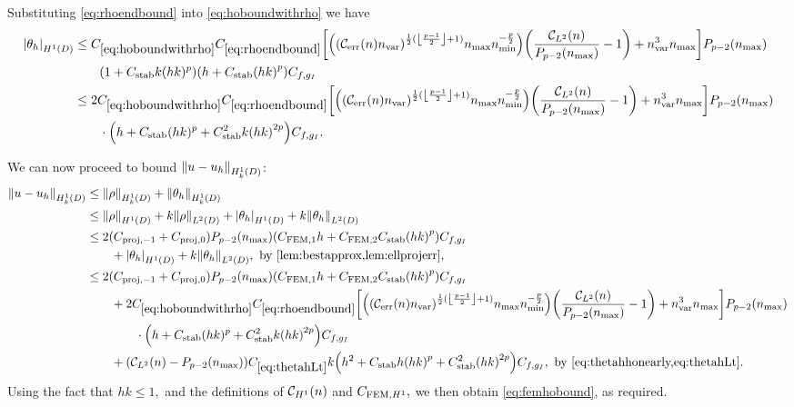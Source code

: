 Substituting \cref{eq:rhoendbound} into \cref{eq:hoboundwithrho} we have
\begin{align}
\SNHoD{\thetah} &\leq \CHobound\Crhoendbound \mleft[ \mleft(\mleft(\En\nvar\mright)^{\half(\floor{\frac{p-1}2}+1)}\nmax\nmin^{-\frac{p}2}\mright) \mleft(\frac{\CLtn(n)}{\Pfn{p-2}\mleft(\nmax\mright)}-1\mright)+  \nvar^3\nmax \mright]\Pfn{p-2}\mleft(\nmax\mright)\nonumber\\
&\quad\quad\mleft( 1 +  \CAnk k(hk)^p\mright)   \mleft( h +  \CAnk \mleft(hk\mright)^p\mright) \Cfg\nonumber\\
 &\leq 2\CHobound\Crhoendbound \mleft[ \mleft(\mleft(\En\nvar\mright)^{\half(\floor{\frac{p-1}2}+1)}\nmax\nmin^{-\frac{p}2}\mright) \mleft(\frac{\CLtn(n)}{\Pfn{p-2}\mleft(\nmax\mright)}-1\mright)+  \nvar^3\nmax \mright]\Pfn{p-2}\mleft(\nmax\mright)\nonumber\\
&\quad\quad\cdot\mleft( h +  \CAnk (hk)^p + \CAnk^2 k\mleft(hk\mright)^{2p}\mright)\Cfg.\label{eq:thetahhonearly}
\end{align}

We can now proceed to bound $\NHokD{u-\uh}$:
\begin{align*}
  \NHokD{u-\uh} & \leq \NHokD{\rho} + \NHokD{\thetah}\\
  &\leq \NHoD{\rho} + k\NLtD{\rho} + \SNHoD{\thetah} + k\NLtD{\thetah}\\
  & \leq 2\mleft(\Cmmofn{-1} + \Cmmofn{0}\mright) \Pfn{p-2}\mleft(\nmax\mright)\mleft(\CFEMo h + \CFEMt \CAnk \mleft(hk\mright)^p\mright) \Cfg\\
  &\quad\quad+ \SNHoD{\thetah} + k\NLtD{\thetah}, \text{ by \cref{lem:bestapprox,lem:ellprojerr},}\\
  &\leq2\mleft(\Cmmofn{-1} + \Cmmofn{0}\mright) \Pfn{p-2}\mleft(\nmax\mright)\mleft(\CFEMo h + \CFEMt \CAnk \mleft(hk\mright)^p\mright) \Cfg\\
  &\quad\quad + 2\CHobound\Crhoendbound \mleft[ \mleft(\mleft(\En\nvar\mright)^{\half(\floor{\frac{p-1}2}+1)}\nmax\nmin^{-\frac{p}2}\mright) \mleft(\frac{\CLtn(n)}{\Pfn{p-2}\mleft(\nmax\mright)}-1\mright)+  \nvar^3\nmax \mright]\Pfn{p-2}\mleft(\nmax\mright)\nonumber\\
  &\quad\quad\quad\quad\cdot\mleft( h +  \CAnk (hk)^p + \CAnk^2 k\mleft(hk\mright)^{2p}\mright)\Cfg\\
  &\quad\quad+\mleft(\CLtn(n)-\Pfn{p-2}\mleft(\nmax\mright)\mright) \CthetahLt k\mleft(h^2 + \CAnk h\mleft(hk\mright)^p + \CAnk^2 \mleft(hk\mright)^{2p}\mright)\Cfg , \text{ by \cref{eq:thetahhonearly,eq:thetahLt}}.
\end{align*}
Using the fact that $hk \leq 1,$ and the definitions of $\mathcal C_{H^{1}}(n)$ and $C_{\mathrm{FEM},H^{1}},$ we then obtain \cref{eq:femhobound}, as required.
\epf
